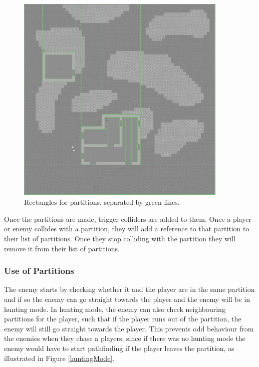 \begin{figure}[H]
\begin{center}
        \includegraphics[width=0.9\textwidth]{figures/generating_levels/partition_colliders.png}
    \caption{Rectangles for partitions, separated by green lines.}\label{fig:partition_colliders_on_map}
\end{center}
\end{figure}

Once the partitions are made, trigger colliders are added to them.
Once a player or enemy collides with a partition, they will add a reference to that partition to their list of partitions.
Once they stop colliding with the partition they will remove it from their list of partitions.

\subsubsection*{Use of Partitions}
The enemy starts by checking whether it and the player are in the same partition and if so the enemy can go straight towards the player and the enemy will be in hunting mode.
In hunting mode, the enemy can also check neighbouring partitions for the player, such that if the player runs out of the partition, the enemy will still go straight towards the player.
This prevents odd behaviour from the enemies when they chase a players, since if there was no hunting mode the enemy would have to start pathfinding if the player leaves the partition, as illustrated in Figure \ref{huntingMode}.

